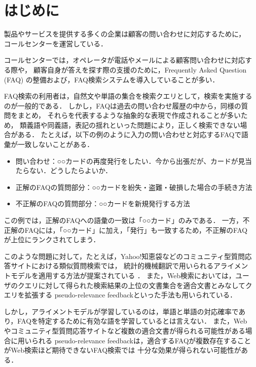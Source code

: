 \documentclass[japanese]{jnlp_1.4}
\begin{document}
\maketitle


\section{はじめに}

製品やサービスを提供する多くの企業は顧客の問い合わせに対応するために，
コールセンターを運営している．

コールセンターでは，オペレータが電話やメールによる顧客問い合わせに対応する際や，
顧客自身が答えを探す際の支援のために，Frequently Asked Question (FAQ) の整備および，FAQ検索システムを導入していることが多い．

FAQ検索の利用者は，自然文や単語の集合を検索クエリとして，検索を実施するのが一般的である．
しかし，FAQは過去の問い合わせ履歴の中から，同様の質問をまとめ，
それらを代表するような抽象的な表現で作成されることが多いため，
類義語や同義語，表記の揺れといった問題により，正しく検索できない場合がある．
たとえば，以下の例のように入力の問い合わせと対応するFAQで語彙が一致しないことがある．
\begin{itemize}
	\item 問い合わせ：○○カードの再度発行をしたい．今から出張だが、カードが見当たらない．どうしたらよいか．
	\item 正解のFAQの質問部分：○○カードを紛失・盗難・破損した場合の手続き方法
	\item 不正解のFAQの質問部分：○○カードを新規発行する方法
\end{itemize}
\noindent
この例では，正解のFAQへの語彙の一致は「○○カード」のみである．
一方，不正解のFAQには，「○○カード」に加え，「発行」も一致するため，不正解のFAQが上位にランクされてしまう．

このような問題に対して，たとえば，Yahoo!知恵袋などのコミュニティ型質問応答サイトにおける類似質問検索では，
統計的機械翻訳で用いられるアライメントモデルを適用する方法が提案されている \cite{riezler:07,soricut:04,xue:08}．
また，Web検索においては，ユーザのクエリに対して得られた検索結果の上位の文書集合を適合文書とみなしてクエリを拡張する
pseudo-relevance feedbackといった手法も用いられている．

  しかし，アライメントモデルが学習しているのは，単語と単語の対応確率であり，FAQを特定するために有効な語を学習しているとは言えない．
また，Webやコミュニティ型質問応答サイトなど複数の適合文書が得られる可能性がある場合に用いられる
pseudo-relevance feedbackは，適合するFAQが複数存在することがWeb検索ほど期待できないFAQ検索では
十分な効果が得られない可能性がある．
\end{document}
